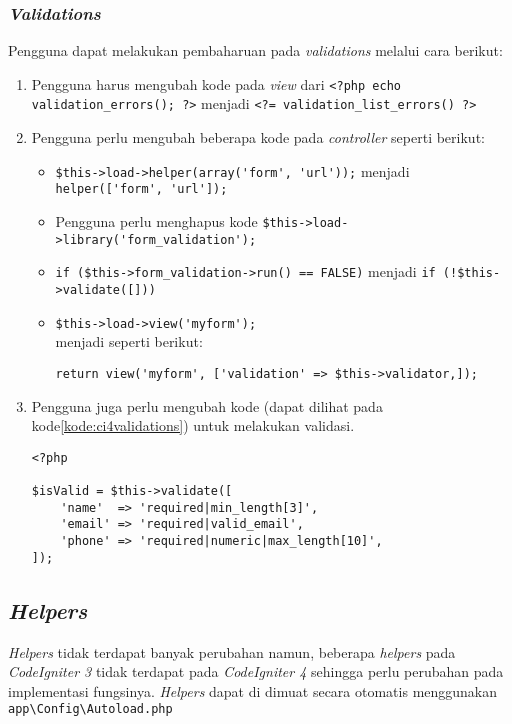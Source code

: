 \subsubsection{\textit{Validations}}
Pengguna dapat melakukan pembaharuan pada \textit{validations} melalui cara berikut:
\begin{enumerate}
\item Pengguna harus mengubah kode pada \textit{view} dari \verb|<?php echo validation_errors(); ?>| menjadi \verb|<?= validation_list_errors() ?>|
\item Pengguna perlu mengubah beberapa kode pada \textit{controller} seperti berikut:
	\begin{itemize}
		\item \verb|$this->load->helper(array('form', 'url'));| menjadi \verb|helper(['form', 'url']);|
		\item Pengguna perlu menghapus kode \verb|$this->load->library('form_validation');|
		\item \verb|if ($this->form_validation->run() == FALSE)| menjadi \verb|if (!$this->validate([]))|
		\item \verb|$this->load->view('myform');| \\ menjadi seperti berikut:
\begin{center}		
 \verb|return view('myform', ['validation' => $this->validator,]);|
\end{center}
	\end{itemize}
	\item Pengguna juga perlu mengubah kode (dapat dilihat pada kode\ref{kode:ci4validations}) untuk melakukan validasi.
	\begin{lstlisting}[caption=Perubahan kode untuk melakukan validasi. ,label=kode:ci4validations]
<?php

$isValid = $this->validate([
    'name'  => 'required|min_length[3]',
    'email' => 'required|valid_email',
    'phone' => 'required|numeric|max_length[10]',
]);
\end{lstlisting}
\end{enumerate}

\subsection{\textit{Helpers}}
 
\textit{Helpers} tidak terdapat banyak perubahan namun, beberapa \textit{helpers} pada \textit{CodeIgniter 3} tidak terdapat pada \textit{CodeIgniter 4} sehingga perlu perubahan pada implementasi fungsinya. \textit{Helpers} dapat di dimuat secara otomatis menggunakan \verb|app\Config\Autoload.php|

